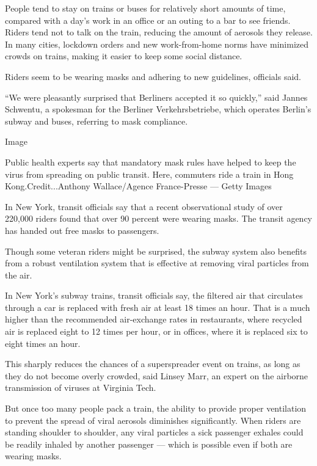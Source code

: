 People tend to stay on trains or buses for relatively short amounts of
time, compared with a day's work in an office or an outing to a bar to
see friends. Riders tend not to talk on the train, reducing the amount
of aerosols they release. In many cities, lockdown orders and new
work-from-home norms have minimized crowds on trains, making it easier
to keep some social distance.

Riders seem to be wearing masks and adhering to new guidelines,
officials said.

``We were pleasantly surprised that Berliners accepted it so quickly,''
said Jannes Schwentu, a spokesman for the Berliner Verkehrsbetriebe,
which operates Berlin's subway and buses, referring to mask compliance.

Image

Public health experts say that mandatory mask rules have helped to keep
the virus from spreading on public transit. Here, commuters ride a train
in Hong Kong.Credit...Anthony Wallace/Agence France-Presse --- Getty
Images

In New York, transit officials say that a recent observational study of
over 220,000 riders found that over 90 percent were wearing masks. The
transit agency has handed out free masks to passengers.

Though some veteran riders might be surprised, the subway system also
benefits from a robust ventilation system that is effective at removing
viral particles from the air.

In New York's subway trains, transit officials say, the filtered air
that circulates through a car is replaced with fresh air at least 18
times an hour. That is a much higher than the recommended air-exchange
rates in restaurants, where recycled air is replaced eight to 12 times
per hour, or in offices, where it is replaced six to eight times an
hour.

This sharply reduces the chances of a superspreader event on trains, as
long as they do not become overly crowded, said Linsey Marr, an expert
on the airborne transmission of viruses at Virginia Tech.

But once too many people pack a train, the ability to provide proper
ventilation to prevent the spread of viral aerosols diminishes
significantly. When riders are standing shoulder to shoulder, any viral
particles a sick passenger exhales could be readily inhaled by another
passenger --- which is possible even if both are wearing masks.

\href{https://www.nytimes3xbfgragh.onion/news-event/coronavirus?action=click\&pgtype=Article\&state=default\&region=MAIN_CONTENT_3\&context=storylines_faq}{}

